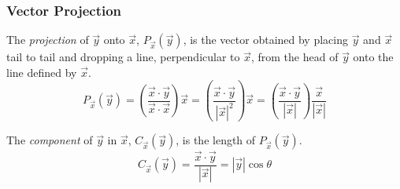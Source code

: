 \documentclass{beamer}
\begin{document}
\begin{frame}
  \frametitle{Vector Projection}

The \emph{projection} of $\vec{y}$ onto $\vec{x}$, $P_{\vec{x}}(\vec{y})$, is the vector obtained by placing $\vec{y}$ and $\vec{x}$ tail to tail and dropping a line, perpendicular to $\vec{x}$, from the head of $\vec{y}$ onto the line defined by $\vec{x}$.
\[
  P_{\vec{x}}(\vec{y})
  = \left(\frac{\vec{x} \cdot \vec{y}}{\vec{x} \cdot \vec{x}}\right) \vec{x}
  = \left(\frac{\vec{x} \cdot \vec{y}}{|\vec{x}|^2}\right)\vec{x}
  = \left(\frac{\vec{x} \cdot \vec{y}}{|\vec{x}|}\right) \frac{\vec{x}}{|\vec{x}|} 
\]

The \emph{component} of $\vec{y}$ in $\vec{x}$, $C_{\vec{x}}(\vec{y})$, is the length of $P_{\vec{x}}(\vec{y})$.
\[
C_{\vec{x}}(\vec{y}) = \frac{\vec{x} \cdot \vec{y}}{|\vec{x}|} = |\vec{y}|\cos \theta
\]

\begin{center}



\end{center}


\end{frame}
\end{document}

